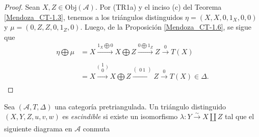 \documentclass[tesis]{subfiles}
\begin{document}
\begin{proof}

    Sean $X,Z\in\text{Obj}(\mathscr{A})$. Por (TR1a) y el inciso (c) del Teorema \ref{Mendoza_CT-1.3}, tenemos a los triángulos distinguidos $\eta=(X,X,0,1_X,0,0)$ y $\mu = (0,Z,Z,0,1_Z,0)$. Luego, de la Proposición \ref{Mendoza_CT-1.6}, se sigue que
    \begin{align*}
        \eta\bigoplus\mu &= X\xrightarrow[]{1_X\bigoplus 0}X\bigoplus Z \xrightarrow[]{0\bigoplus 1_Z} Z\xrightarrow[]{0} T(X) \\
                      &= X \xrightarrow[]{\big(\begin{smallmatrix} 1 \\ 0 \end{smallmatrix}\big)} X\bigoplus Z \xrightarrow[]{(\begin{smallmatrix} 0 \ 1 \end{smallmatrix})} Z \xrightarrow[]{0} T(X) \in\Delta.
    \end{align*}
\end{proof}

\begin{Def}\label{Def: Triángulo escindible}
    
    Sea $(\mathscr{A},T,\Delta)$ una categoría pretriangulada. Un triángulo distinguido $(X,Y,Z,u,v,w)$ es \emph{escindible} si existe un isomorfismo $\lambda:Y\xrightarrow[]{\sim}X\coprod Z$ tal que el siguiente diagrama en $\mathscr{A}$ conmuta
    \begin{center}
    \end{center}
\end{Def}
\end{document}
